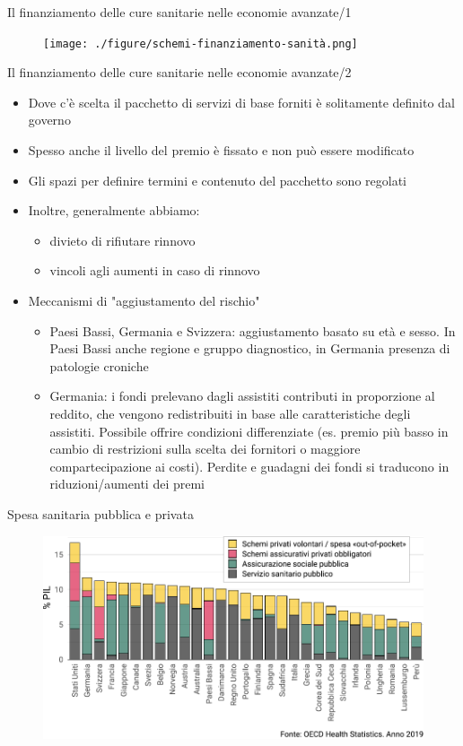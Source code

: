 \documentclass[aspectratio=64,11pt]{beamer}
\begin{document}
\begin{frame}{Il finanziamento delle cure sanitarie nelle economie avanzate/1}
\begin{figure}[htbp]
\centering
\texttt{[image: ./figure/schemi-finanziamento-sanità.png]}
\end{figure}
\end{frame}


\begin{frame}{Il finanziamento delle cure sanitarie nelle economie avanzate/2}
\begin{itemize}
\item Dove c’è scelta il pacchetto di servizi di base forniti è solitamente
definito dal governo
\item Spesso anche il livello del premio è fissato e non può essere modificato
\item Gli spazi per definire termini e contenuto del pacchetto sono regolati
\item Inoltre, generalmente abbiamo:
\begin{itemize}
\item divieto di rifiutare rinnovo
\item vincoli agli aumenti in caso di rinnovo
\end{itemize}
\item Meccanismi di "aggiustamento del rischio"
\begin{itemize}
\item Paesi Bassi, Germania e Svizzera: aggiustamento basato su età e sesso. In
Paesi Bassi anche regione e gruppo diagnostico, in Germania presenza di
patologie croniche
\item Germania: i fondi prelevano dagli assistiti contributi in proporzione al
reddito, che vengono redistribuiti in base alle caratteristiche degli
assistiti. Possibile offrire condizioni differenziate (es. premio più
basso in cambio di restrizioni sulla scelta dei fornitori o maggiore
compartecipazione ai costi). Perdite e guadagni dei fondi si traducono in
riduzioni/aumenti dei premi
\end{itemize}
\end{itemize}
\end{frame}

\begin{frame}{Spesa sanitaria pubblica e privata}
\begin{figure}[htbp]
\centering
\includegraphics[width=.95\textwidth]{./figure/spesa-sanitaria-per-schema-color.pdf}
\end{figure}
\end{frame}
\end{document}
